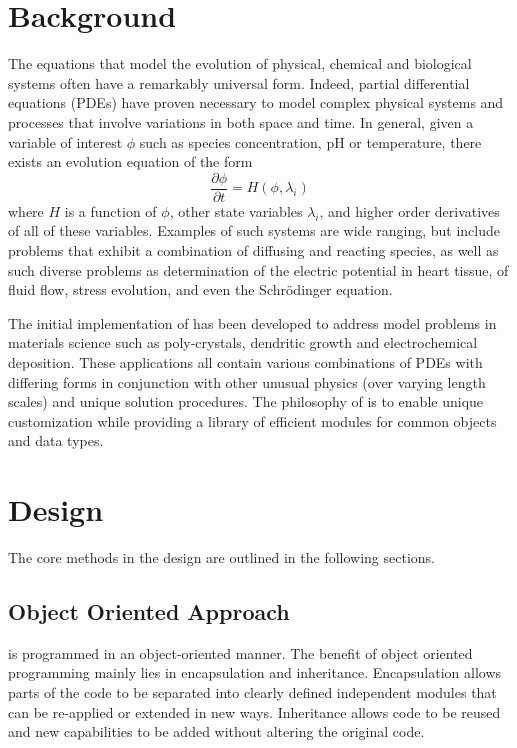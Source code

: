 \section{Background}

The equations that model the evolution of physical, chemical and
biological systems often have a remarkably universal form.  Indeed,
partial differential equations (PDEs) have proven necessary to model
complex physical systems and processes that involve variations in both
space and time.  In general, given a variable of interest \( \phi \)
such as species concentration, pH or temperature, there exists an
evolution equation of the form
\begin{equation}
  \frac{\partial \phi}{\partial t} = H(\phi, \lambda_i)
  \label{eqn:general-equation}
\end{equation}
where \( H \) is a function of \(\phi\), other state variables
\(\lambda_i\), and higher order derivatives of all of these variables.
Examples of such systems are wide ranging, but include problems that
exhibit a combination of diffusing and reacting species, as well as
such diverse problems as determination of the electric potential in
heart tissue, of fluid flow, stress evolution, and even the
Schr\"odinger equation.

The initial implementation of \FiPy{} has been developed to address
model problems in materials science such as poly-crystals, dendritic
growth and electrochemical deposition. These applications all contain
various combinations of PDEs with differing forms in conjunction with
other unusual physics (over varying length scales) and unique solution
procedures. The philosophy of \FiPy{} is to enable unique
customization while providing a library of efficient modules for
common objects and data types.

\section{Design}

The core methods in the \FiPy{} design are outlined in the following
sections.

\subsection{Object Oriented Approach}

\FiPy{} is programmed in an object-oriented manner.  The benefit of
object oriented programming mainly lies in encapsulation and
inheritance.  Encapsulation allows parts of the code to be separated
into clearly defined independent modules that can be re-applied or
extended in new ways.  Inheritance allows code to be reused and new
capabilities to be added without altering the original code.

